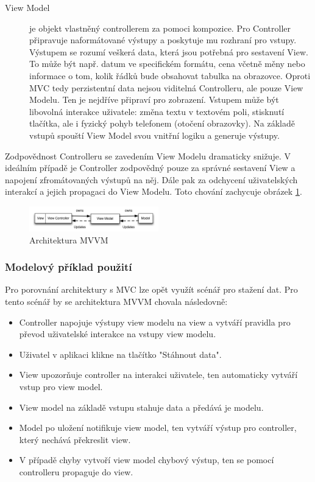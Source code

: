 \begin{description}
  \item[View Model] je objekt vlastněný controllerem za pomoci kompozice.
  Pro Controller připravuje naformátované výstupy a poskytuje mu rozhraní pro vstupy.
  Výstupem se rozumí veškerá data, která jsou potřebná pro sestavení View.
  To může být např. datum ve specifickém formátu, cena včetně měny nebo informace o tom, kolik řádků bude obsahovat tabulka na obrazovce.
  Oproti MVC tedy perzistentní data nejsou viditelná Controlleru, ale pouze View Modelu.
  Ten je nejdříve připraví pro zobrazení.
  Vstupem může být libovolná interakce uživatele:
  změna textu v textovém poli, stisknutí tlačítka, ale i fyzický pohyb telefonem (otočení obrazovky).
  Na základě vstupů spouští View Model svou vnitřní logiku a generuje výstupy.
\end{description}

Zodpovědnost Controlleru se zavedením View Modelu dramaticky snižuje.
V ideálním případě je Controller zodpovědný pouze za správné sestavení View a napojení zfromátovaných výstupů na něj.
Dále pak za odchycení uživatelských interakcí a jejich propagaci do View Modelu.
Toto chování zachycuje obrázek \ref{architektura-mvvm}.

\begin{figure}\centering
	\includegraphics[width=0.5\textwidth]{assets/mvvm-architecture.png}
	\caption[Architektura MVVM]{Architektura MVVM}\label{architektura-mvvm}
\end{figure}

\subsubsection{Modelový příklad použití}

Pro porovnání architektury s MVC lze opět využít scénář pro stažení dat. Pro tento scénář by se architektura MVVM chovala následovně:
\begin{itemize}
  \item Controller napojuje výstupy view modelu na view a vytváří pravidla pro převod uživatelské interakce na vstupy view modelu.
  \item Uživatel v aplikaci klikne na tlačítko "Stáhnout data".
  \item View upozorňuje controller na interakci uživatele, ten automaticky vytváří vstup pro view model.
  \item View model na základě vstupu stahuje data a předává je modelu.
  \item Model po uložení notifikuje view model, ten vytváří výstup pro controller, který nechává překreslit view.
  \item V případě chyby vytvoří view model chybový výstup, ten se pomocí controlleru propaguje do view.
\end{itemize}


